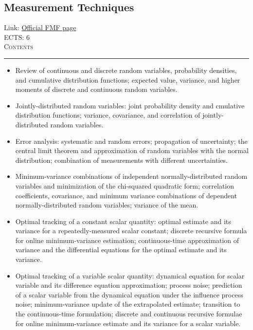 \documentclass[11pt, a4paper]{article}
\newenvironment{course}[3]{
\subsection{#1}%
Link: \href{#2}{Official FMF page}\\%
ECTS: #3%
\vspace{1ex}
\\
{\large \textsc{Contents}}\\[-0.9ex]%
\rule{\textwidth}{0.5pt}
\vspace{-3ex}
}
{}
\newenvironment{chapter}[1]{
\begin{tcolorbox}[title=#1, breakable]
}
{\end{tcolorbox}}
\begin{document}
\begin{course}{Measurement Techniques}{https://www.fmf.uni-lj.si/en/study-physics/programmes/1fiz/2020/7000777/courses/1441/}{6}
    \label{measurement-techniques}

    \begin{chapter}{Error analysis and optimal combination}
        \begin{itemize}
        
            \item Review of continuous and discrete random variables, probability densities, and cumulative distribution functions; expected value, variance, and higher moments of discrete and continuous random variables.

            \item Jointly-distributed random variables: joint probability density and cmulative distribution functions; variance, covariance, and correlation of jointly-distributed random variables.

            \item Error analysis: systematic and random errors; propagation of uncertainty; the central limit theorem and approximation of random variables with the normal distribution; combination of measurements with different uncertainties.

            \item Minimum-variance combinations of independent normally-distributed random variables and minimization of the chi-squared quadratic form; correlation coefficients, covariance, and minimum variance combinations of dependent normally-distributed random variables; variance of the mean.

        \end{itemize}
    \end{chapter}

    \begin{chapter}{The Kalman filter}
        \begin{itemize}
        
            \item Optimal tracking of a constant scalar quantity: optimal estimate and its variance for a repeatedly-measured scalar constant; discrete recursive formula for online minimum-variance estimation; continuous-time approximation of variance and the differential equations for the optimal estimate and its variance.

            \item Optimal tracking of a variable scalar quantity: dynamical equation for scalar variable and its difference equation approximation; process noise; prediction of a scalar variable from the dynamical equation under the influence process noise; minimum-variance update of the extrapolated estimate; transition to the continuous-time formulation; discrete and continuous recursive formulae for online minimum-variance estimate and its variance for a scalar variable.


\end{itemize}
\end{chapter}
\end{course}
\end{document}
